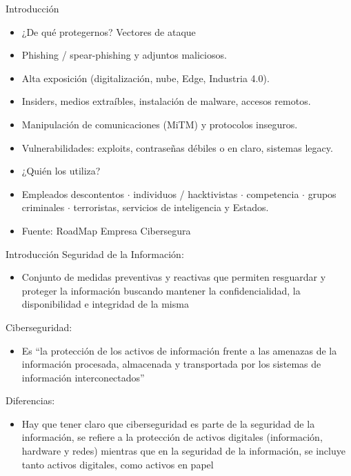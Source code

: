 \documentclass[aspectratio=169,11pt]{beamer}
\begin{document}
\begin{frame}[allowframebreaks]{Introducción}
\small
  \begin{itemize}
  \item ¿De qué protegernos? Vectores de ataque
  \item Phishing / spear-phishing y adjuntos maliciosos.
  \item Alta exposición (digitalización, nube, Edge, Industria 4.0).
  \item Insiders, medios extraíbles, instalación de malware, accesos remotos.
  \item Manipulación de comunicaciones (MiTM) y protocolos inseguros.
  \item Vulnerabilidades: exploits, contraseñas débiles o en claro, sistemas legacy.
  \item ¿Quién los utiliza?
  \item Empleados descontentos $\cdot$ individuos / hacktivistas $\cdot$ competencia $\cdot$ grupos criminales $\cdot$ terroristas, servicios de inteligencia y Estados.
  \item Fuente: RoadMap Empresa Cibersegura
  \end{itemize}
\end{frame}

\begin{frame}[allowframebreaks]{Introducción}
\small
  Seguridad de la Información:
\begin{itemize}
  \item Conjunto de medidas preventivas y reactivas que permiten resguardar y proteger la información buscando mantener la confidencialidad, la disponibilidad e integridad de la misma
\end{itemize}
  Ciberseguridad:  
  \begin{itemize}
  \item Es ``la protección de los activos de información frente a las amenazas de la información procesada, almacenada y transportada por los sistemas de información interconectados''
  \end{itemize}
  Diferencias:
  \begin{itemize}
  \item Hay que tener claro que ciberseguridad es parte de la seguridad de la información, se refiere a la protección de activos digitales (información, hardware y redes) mientras que en la seguridad de la información, se incluye tanto activos digitales, como activos en papel
  \end{itemize}
\end{frame}
\end{document}
